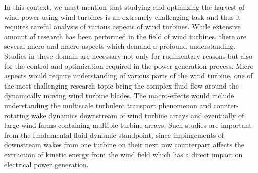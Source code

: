 In this context, we must mention that studying and optimizing the harvest of wind power using wind turbines is an extremely challenging task and thus it requires careful analysis of various aspects of wind turbines. While extensive amount of research has been performed in the field of wind turbines, there are several micro and macro aspects which demand a profound understanding. Studies in these domain are necessary not only for rudimentary reasons but also for the control and optimization required in the power generation process. Micro aspects would require understanding of various parts of the wind turbine, one of the most challenging research topic being the complex fluid flow around the dynamically moving wind turbine blades. The macro-effects would include understanding the multiscale turbulent transport phenomenon and counter-rotating wake dynamics downstream of wind turbine arrays and eventually of large wind farms containing multiple turbine arrays. Such studies are important from the fundamental fluid dynamic standpoint, since impingements of downstream wakes from one turbine on their next row counterpart affects the extraction of kinetic energy from the wind field which has a direct impact on electrical power generation.

